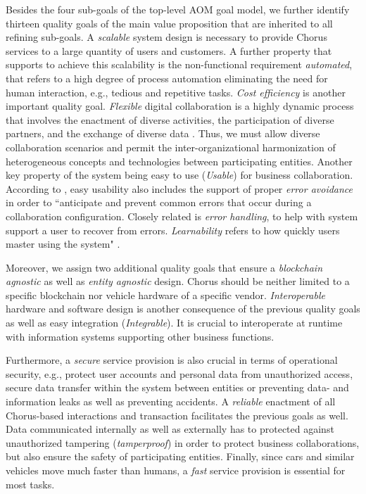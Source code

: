 \documentclass{llncs}
\begin{document}
{				Besides the four sub-goals of the top-level AOM goal model, we further identify thirteen quality goals of the main value proposition that are inherited to all refining sub-goals. A \textit{scalable} system design is necessary to provide Chorus services to a large quantity of users and customers. A further property that supports to achieve this scalability is the non-functional requirement \textit{automated}, that refers to a high degree of process automation eliminating the need for human interaction, e.g., tedious and repetitive tasks. \textit{Cost efficiency} is another important quality goal. \textit{Flexible} digital collaboration is a highly dynamic process that involves the enactment of diverse activities, the participation of diverse partners, and the exchange of diverse data \cite{norta2008exploring}. Thus, we must allow diverse collaboration scenarios and permit the inter-organizational harmonization of heterogeneous concepts and technologies between participating entities. Another key property of the system being easy to use (\textit{Usable}) for business collaboration. According to \cite{norta2014reference}, easy usability also includes the support of proper \textit{error avoidance} in order to ``anticipate and prevent common errors that occur during a collaboration configuration. Closely related is \textit{error handling}, to help with system support a user to recover from errors. \textit{Learnability} refers to how quickly users master using the system" \cite{norta2014reference}. 
				
				Moreover, we assign two additional quality goals that ensure a \textit{blockchain agnostic} as well as \textit{entity agnostic} design. Chorus should be neither limited to a specific blockchain nor vehicle hardware of a specific vendor. \textit{Interoperable} hardware and software design is another consequence of the previous quality goals as well as easy integration (\textit{Integrable}). It is crucial to interoperate at runtime with information systems supporting other business functions.
				
				Furthermore, a \textit{secure} service provision is also crucial in terms of operational security, e.g., protect user accounts and personal data from unauthorized access, secure data transfer within the system between entities or preventing data- and information leaks as well as preventing accidents. A \textit{reliable} enactment of all Chorus-based interactions and transaction facilitates the previous goals as well. Data communicated internally as well as externally has to protected against unauthorized tampering (\textit{tamperproof}) in order to protect business collaborations, but also ensure the safety of participating entities. Finally, since cars and similar vehicles move much faster than humans, a \textit{fast} service provision is essential for most tasks.
			
}
\end{document}
